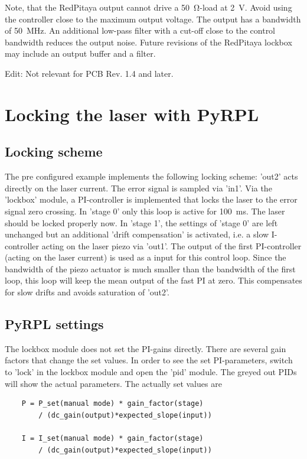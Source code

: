 \documentclass[twoside,a4paper]{refart}
\begin{document}
Note, that the RedPitaya output cannot drive a \qty{50}{\ohm}-load at \qty{2}{\volt}. Avoid using the controller close to the maximum output voltage. The output has a bandwidth of \qty{50}{\mega\hertz}. An additional low-pass filter with a cut-off close to the control bandwidth reduces the output noise. Future revisions of the RedPitaya lockbox may include an output buffer and a filter.

Edit: Not relevant for PCB Rev. 1.4 and later.

 

\section{Locking the laser with PyRPL}

\subsection{Locking scheme}
The pre configured example implements the following locking scheme: 'out2' acts directly on the laser current. The error signal is sampled via 'in1'. Via the 'lockbox' module, a PI-controller is implemented that locks the laser to the error signal zero crossing. In 'stage 0' only this loop is active for \qty{100}{\milli\second}. The laser should be locked properly now. In 'stage 1', the settings of 'stage 0' are left unchanged but an additional 'drift compensation' is activated, i.e. a slow I-controller acting on the laser piezo via 'out1'. The output of the first PI-controller (acting on the laser current) is used as a input for this control loop. Since the bandwidth of the piezo actuator is much smaller than the bandwidth of the first loop, this loop will keep the mean output of the fast PI at zero. This compensates for slow drifts and avoids saturation of 'out2'.




\subsection{PyRPL settings}

The lockbox module does not set the PI-gains directly. There are several gain factors that change the set values. In order to see the set PI-parameters, switch to 'lock' in the lockbox module and open the 'pid' module. The greyed out PIDs will show the actual parameters.  The actually set values are


\begin{tcolorbox}
	\begin{verbatim}
	P = P_set(manual mode) * gain_factor(stage) 
	    / (dc_gain(output)*expected_slope(input))
			  
	I = I_set(manual mode) * gain_factor(stage) 
	    / (dc_gain(output)*expected_slope(input))
	\end{verbatim}
\end{tcolorbox}
\end{document}
